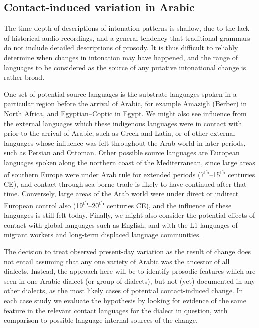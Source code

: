 \documentclass[output=paper]{langsci/langscibook}
\begin{document}
 
 \subsection{Contact-induced variation in Arabic} \label{aravar}


The time depth of descriptions of intonation patterns is shallow, due to the lack of historical audio recordings, and a general tendency that traditional grammars do not include detailed descriptions of prosody. It is thus difficult to reliably determine when changes in intonation may have happened, and the range of languages to be considered as the source of any putative intonational change is rather broad. 

One set of potential source languages is the substrate languages spoken in a particular region before the arrival of Arabic, for example Amazigh (Berber) in North Africa, and Egyptian--Coptic in Egypt. We might also see influence from the external languages which these indigenous languages were in contact with prior to the arrival of Arabic, such as Greek and Latin, or of other external languages whose influence was felt throughout the Arab world in later periods, such as Persian and Ottoman. Other possible source languages are European languages spoken along the northern coast of the Mediterranean, since large areas of southern Europe were under Arab rule for extended periods (7\textsuperscript{th}--15\textsuperscript{th} centuries CE), and contact through sea-borne trade is likely to have continued after that time. Conversely, large areas of the Arab world were under direct or indirect European control also (19\textsuperscript{th}--20\textsuperscript{th} centuries CE), and the influence of these languages is still felt today. Finally, we might also consider the potential effects of contact with global languages such as English, and with the L1 languages of migrant workers and long-term displaced language communities.

The decision to treat observed present-day variation as the result of change does not entail assuming that any one variety of Arabic was the ancestor of all dialects. Instead, the approach here will be to identify prosodic features which are seen in one Arabic dialect (or group of dialects), but not (yet) documented in any other dialects, as the most likely cases of potential contact-induced change. In each case study we evaluate the hypothesis by looking for evidence of the same feature in the relevant contact languages for the dialect in question, with comparison to possible language-internal sources of the change. 
\end{document}
